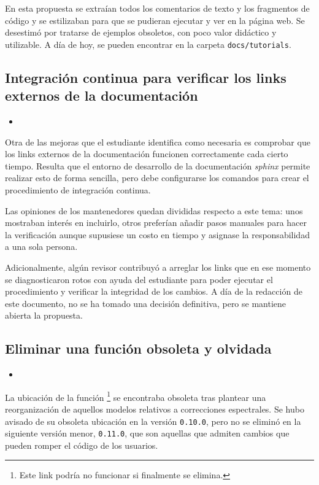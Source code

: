 En esta propuesta se extraían todos los comentarios de texto y los fragmentos de código y se estilizaban para que se pudieran ejecutar y ver en la página web. Se desestimó por tratarse de ejemplos obsoletos, con poco valor didáctico y utilizable. A día de hoy, se pueden encontrar en la carpeta \texttt{docs/tutorials}.

\subsection{Integración continua para verificar los links externos de la documentación}

\begin{itemize}
    \item {}
\end{itemize}

Otra de las mejoras que el estudiante identifica como necesaria es comprobar que los links externos de la documentación funcionen correctamente cada cierto tiempo. Resulta que el entorno de desarrollo de la documentación \textit{sphinx} permite realizar esto de forma sencilla, pero debe configurarse los comandos para crear el procedimiento de integración continua.

Las opiniones de los mantenedores quedan divididas respecto a este tema: unos mostraban interés en incluirlo, otros preferían añadir pasos manuales para hacer la verificación aunque supusiese un costo en tiempo y asignase la responsabilidad a una sola persona.

Adicionalmente, algún revisor contribuyó a arreglar los links que en ese momento se diagnosticaron rotos con ayuda del estudiante para poder ejecutar el procedimiento y verificar la integridad de los cambios. A día de la redacción de este documento, no se ha tomado una decisión definitiva, pero se mantiene abierta la propuesta.

\subsection{Eliminar una función obsoleta y olvidada}

\begin{itemize}
    \item {}
\end{itemize}

La ubicación de la función \footnote{Este link podría no funcionar si finalmente se elimina.} se encontraba obsoleta tras plantear una reorganización de aquellos modelos relativos a correcciones espectrales. Se hubo avisado de su obsoleta ubicación en la versión \texttt{0.10.0}, pero no se eliminó en la siguiente versión menor, \texttt{0.11.0}, que son aquellas que admiten cambios que pueden romper el código de los usuarios.


